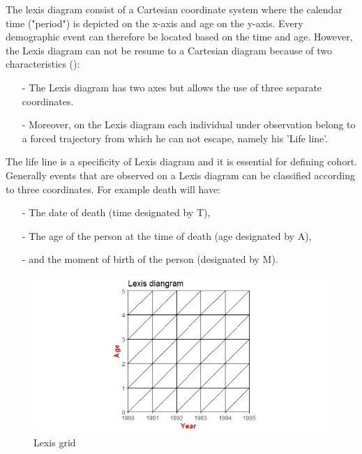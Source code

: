 The lexis diagram consist of a Cartesian coordinate system where the calendar time ("period") is depicted on the x-axis and age on the y-axis. Every demographic event can therefore be located based on the time and age.
However, the Lexis diagram can not be resume to a Cartesian diagram because of two characteristics (\cite{C01}):
        \begin{itemize}
            \item[-]The Lexis diagram has two axes but allows the use of three separate coordinates. \item[-]Moreover, on the Lexis diagram each individual under observation belong to a forced trajectory from which he can not escape, namely his 'Life line'. 
        \end{itemize}
The life line is a specificity of Lexis diagram and it is essential for defining cohort.
Generally events that are observed on a Lexis diagram can be classified according to three coordinates. For example death will have:
        \begin{itemize}
         \item[-]The date of death (time designated by T), 
         \item[-]The age of the person at the time of death (age designated by A), 
         \item[-]and the moment of birth of the person (designated by M).
        \end{itemize}




        \begin{figure}[tbh]
         \centering
          \includegraphics[width=\linewidth]{figures/lexis_plot1.jpeg}
          \caption{Lexis grid}
          \label{fig:lexis1}
        \end{figure}

